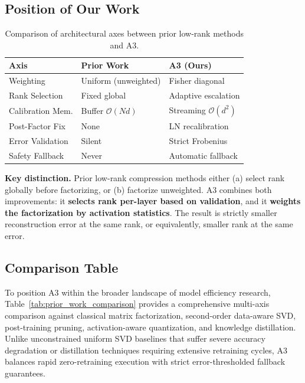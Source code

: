 \subsection{Position of Our Work}

\begin{table}[H]
\centering
\scriptsize
\setlength{\tabcolsep}{3pt}
\begin{tabular}{p{}p{}p{}}
\toprule
\textbf{Axis} & \textbf{Prior Work} & \textbf{A3 (Ours)} \\
\midrule
Weighting & Uniform (unweighted) & Fisher diagonal \\
Rank Selection & Fixed global & Adaptive escalation \\
Calibration Mem. & Buffer $\mathcal{O}(Nd)$ & Streaming $\mathcal{O}(d^2)$ \\
Post-Factor Fix & None & LN recalibration \\
Error Validation & Silent & Strict Frobenius \\
Safety Fallback & Never & Automatic fallback \\
\bottomrule
\end{tabular}
\caption{Comparison of architectural axes between prior low-rank methods and A3.}
\label{tab:positioning}
\end{table}

\textbf{Key distinction.} Prior low-rank compression methods either (a) select 
rank globally before factorizing, or (b) factorize unweighted. A3 combines 
both improvements: it \textbf{selects rank per-layer based on validation}, and it 
\textbf{weights the factorization by activation statistics}. The result is 
strictly smaller reconstruction error at the same rank, or equivalently, 
smaller rank at the same error.

\subsection{Comparison Table}
\label{sec:related_comparison}

To position A3 within the broader landscape of model efficiency research, Table~\ref{tab:prior_work_comparison} provides a comprehensive multi-axis comparison against classical matrix factorization, second-order data-aware SVD, post-training pruning, activation-aware quantization, and knowledge distillation. Unlike unconstrained uniform SVD baselines that suffer severe accuracy degradation or distillation techniques requiring extensive retraining cycles, A3 balances rapid zero-retraining execution with strict error-thresholded fallback guarantees.

